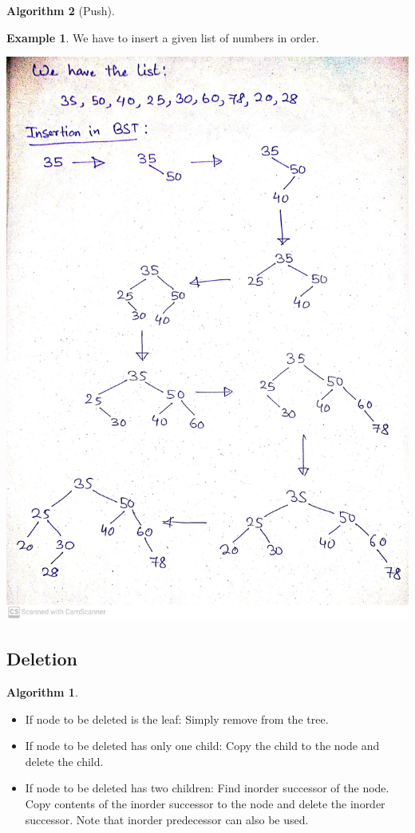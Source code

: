 \documentclass[10pt, a4paper]{extarticle}
\theoremstyle{definition}
\newtheorem{alg}{Algorithm}
\newtheorem{eg}{Example}
\begin{document}
\begin{alg}[Push]
	\begin{eg}
		We have to insert a given list of numbers in order.
		\begin{center}
			\includegraphics[scale=0.1]{bst4.jpg}\\
		\end{center}
	\end{eg}
	\subsection{Deletion}
	\begin{alg}\hfill
		\begin{itemize}
			\item If node to be deleted is the leaf: Simply remove from the tree. 
			\item If node to be deleted has only one child: Copy the child to the node and delete the child.
			\item If node to be deleted has two children: Find inorder successor of the node. Copy contents of the inorder successor to the node and delete the inorder successor. Note that inorder predecessor can also be used. 
		\end{itemize}
	\end{alg}


\end{alg}
\end{document}
